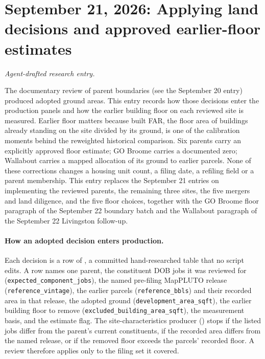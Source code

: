 \clearpage
\section*{September 21, 2026: Applying land decisions and approved earlier-floor estimates}
\textit{Agent-drafted research entry.}

The documentary review of parent boundaries (see the September 20 entry)
produced adopted ground areas. This entry records how those decisions enter
the production panels and how the earlier building floor on each reviewed
site is measured. Earlier floor matters because built FAR, the floor area of
buildings already standing on the site divided by its ground, is one of the
calibration moments behind the reweighted historical comparison. Six parents
carry an explicitly approved floor estimate; GO Broome carries a documented
zero; Wallabout carries a mapped allocation of its ground to earlier parcels.
None of these corrections changes a housing unit count, a filing date, a
refiling field or a parent membership. This entry replaces the September 21
entries on implementing the reviewed parents, the remaining three sites, the
five mergers and land diligence, and the five floor choices, together with
the GO Broome floor paragraph of the September 22 boundary batch and the
Wallabout paragraph of the September 22 Livingston follow-up.

\paragraph{How an adopted decision enters production.}
Each decision is a row of
, a
committed hand-researched table that no script edits. A row names one parent,
the constituent DOB jobs it was reviewed for
(\texttt{expected\_component\_jobs}), the named pre-filing MapPLUTO release
(\texttt{reference\_vintage}), the earlier parcels (\texttt{reference\_bbls})
and their recorded area in that release, the adopted ground
(\texttt{development\_area\_sqft}), the earlier building floor to remove
(\texttt{excluded\_building\_area\_sqft}), the measurement basis, and the
estimate flag. The site-characteristics producer
() stops if the listed jobs
differ from the parent's current constituents, if the recorded area differs
from the named release, or if the removed floor exceeds the parcels' recorded
floor. A review therefore applies only to the filing set it covered.

